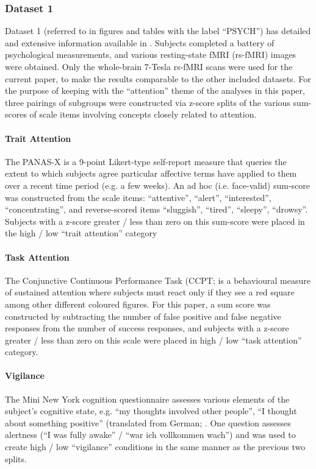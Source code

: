 \documentclass[NETN,manuscript]{stjour-new}
\begin{document}
\subsubsection{Dataset 1}
Dataset 1 (referred to in figures and tables with the label ``PSYCH'') has detailed and extensive
information available in \cite{gorgolewskiHighResolution7Tesla2015}. Subjects completed a battery of
psychological measurements, and various resting-state fMRI (rs-fMRI) images were obtained. Only the
whole-brain 7-Tesla rs-fMRI scans were used for the current paper, to make the results comparable to
the other included datasets. For the purpose of keeping with the ``attention'' theme of the analyses
in this paper, three pairings of subgroups were constructed via z-score splits of the various
sum-scores of scale items involving concepts closely related to attention.

\paragraph{Trait Attention}
The PANAS-X \citep{watsonPANASXManualPositive1994} is a 9-point Likert-type self-report measure
that queries the extent to which subjects agree particular affective terms have applied to them over
a recent time period (e.g. a few weeks). An ad hoc (i.e. face-valid) sum-score was constructed from
the scale items: ``attentive'', ``alert'', ``interested'', ``concentrating'', and reverse-scored items
``sluggish'', ``tired'', ``sleepy'', ``drowsy''. Subjects with a z-score greater / less than zero on this
sum-score were placed in the high / low ``trait attention'' category

\paragraph{Task Attention}
The Conjunctive Continuous Performance Task (CCPT;
\cite{shalevConjunctiveContinuousPerformance2011} is a behavioural measure of sustained attention
where subjects must react only if they see a red square among other different coloured figures. For
this paper, a sum score was constructed by subtracting the number of false positive and false
negative responses from the number of success responses, and subjects with a z-score greater / less
than zero on this scale were placed in high / low ``task attention'' category.

\paragraph{Vigilance}
The Mini New York cognition questionnaire assesses various elements of the subject's cognitive
state, e.g. ``my thoughts involved other people'', ``I thought about something positive'' (translated
from German; \cite{gorgolewskiCorrespondenceIndividualDifferences2014}. One question assesses
alertness (``I was fully awake'' / ``war ich vollkommen wach'') and was used to create high / low
``vigilance'' conditions in the same manner as the previous two splits.
\end{document}
